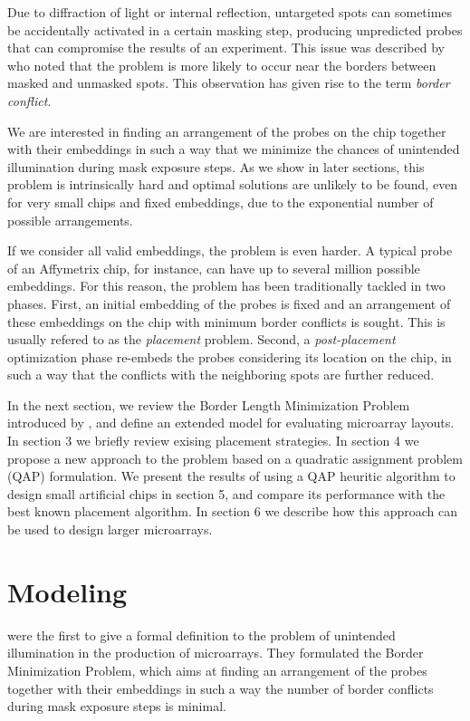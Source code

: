 \documentclass{bioinfo}
\begin{document}
Due to diffraction of light or internal reflection, untargeted spots can sometimes be accidentally activated in a certain masking step, producing unpredicted probes that can compromise the results of an experiment. This issue was described by \citealp{FODOR91} who noted that the problem is more likely to occur near the borders between masked and unmasked spots. This observation has given rise to the term \emph{border conflict}.

We are interested in finding an arrangement of the probes on the chip together with their embeddings in such a way that we minimize the chances of unintended illumination during mask exposure steps. As we show in later sections, this problem is intrinsically hard and optimal solutions are unlikely to be found, even for very small chips and fixed embeddings, due to the exponential number of possible arrangements.

If we consider all valid embeddings, the problem is even harder. A typical probe of an Affymetrix chip, for instance, can have up to several million possible embeddings. For this reason, the problem has been traditionally tackled in two phases. First, an initial embedding of the probes is fixed and an arrangement of these embeddings on the chip with minimum border conflicts is sought. This is usually refered to as the \emph{placement} problem. Second, a \emph{post-placement} optimization phase re-embeds the probes considering its location on the chip, in such a way that the conflicts with the neighboring spots are further reduced.

In the next section, we review the Border Length Minimization Problem introduced by \citealp{HANNENHALLI02}, and define an extended model for evaluating microarray layouts. In section 3 we briefly review exising placement strategies. In section 4 we propose a new approach to the problem based on a quadratic assignment problem (QAP) formulation. We present the results of using a QAP heuritic algorithm to design small artificial chips in section 5, and compare its performance with the best known placement algorithm. In section 6 we describe how this approach can be used to design larger microarrays.

\section{Modeling}

\citealp{HANNENHALLI02} were the first to give a formal definition to the problem of unintended illumination in the production of microarrays. They formulated the Border Minimization Problem, which aims at finding an arrangement of the probes together with their embeddings in such a way the number of border conflicts during mask exposure steps is minimal.
\end{document}
